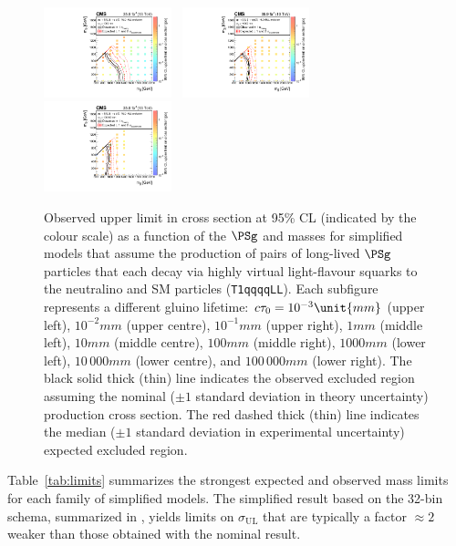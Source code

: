 \begin{figure}[!t]
  \includegraphics[width=0.33\textwidth]{Figures/T1qqqqLL1000XSEC}~
  \includegraphics[width=0.33\textwidth]{Figures/T1qqqqLL10000XSEC}~
  \includegraphics[width=0.33\textwidth]{Figures/T1qqqqLL100000XSEC}\\
  \caption{Observed upper limit in cross section at 95\% CL (indicated
    by the colour scale) as a function of the $\PSg$ and \PSGczDo
    masses for simplified models that assume the production of pairs
    of long-lived $\PSg$ particles that each decay via highly virtual
    light-flavour squarks to the neutralino and SM particles
    (\texttt{T1qqqqLL}). Each subfigure represents a different gluino
    lifetime: 
    $\ctau = 10^{-3}\unit{mm}$ (upper left),
    $10^{-2}\unit{mm}$ (upper centre),
    $10^{-1}\unit{mm}$ (upper right),
    $1\unit{mm}$ (middle left),
    $10\unit{mm}$ (middle centre),
    $100\unit{mm}$ (middle right),
    $1000\unit{mm}$ (lower left),
    $10\,000\unit{mm}$ (lower centre), 
    and $100\,000\unit{mm}$ (lower right). 
    The black solid thick (thin) line indicates the observed excluded
    region assuming the nominal (${\pm}1$ standard deviation in theory
    uncertainty) production cross section. The red dashed thick (thin)
    line indicates the median (${\pm}1$ standard deviation in
    experimental uncertainty) expected excluded region.  
  }
  \label{fig:limits-ll} 
\end{figure} 

Table~\ref{tab:limits} summarizes the strongest expected and observed
mass limits for each family of simplified models. The simplified
result based on the 32-bin schema, summarized in \suppMaterial, yields
limits on $\sigma_\text{UL}$ that are typically a factor ${\approx}2$
weaker than those obtained with the nominal result.

